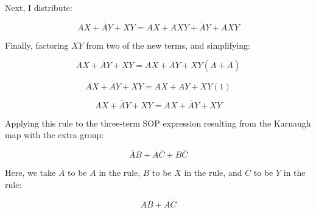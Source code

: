 Next, I distribute:

$$AX + \overline{A}Y + XY = AX + AXY + \overline{A}Y + \overline{A}XY$$

Finally, factoring $XY$ from two of the new terms, and simplifying:

$$AX + \overline{A}Y + XY = AX + \overline{A}Y + XY(A + \overline{A})$$

$$AX + \overline{A}Y + XY = AX + \overline{A}Y + XY(1)$$

$$AX + \overline{A}Y + XY = AX + \overline{A}Y + XY$$

Applying this rule to the three-term SOP expression resulting from the Karnaugh map with the extra group:

$$\overline{A}B + A\overline{C} + B\overline{C}$$

Here, we take $\overline{A}$ to be $A$ in the rule, $B$ to be $X$ in the rule, and $\overline{C}$ to be $Y$ in the rule:

$$\overline{A}B + A\overline{C}$$











